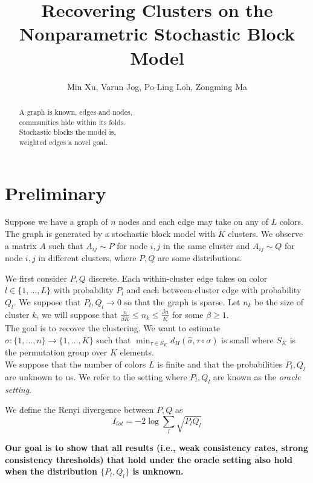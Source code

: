 \documentclass{article}
\begin{document}
\title{Recovering Clusters on the Nonparametric Stochastic Block Model}
\author{Min Xu, Varun Jog, Po-Ling Loh, Zongming Ma}
\maketitle

\begin{abstract}
\centering
\noindent 
A graph is known, edges and nodes, \\
communities hide within its folds. \\
Stochastic blocks the model is, \\
weighted edges a novel goal.
\end{abstract}

\tableofcontents


\newpage
\section{Preliminary}

Suppose we have a graph of $n$ nodes and each edge may take on any of $L$ colors. The graph is generated by a stochastic block model with $K$ clusters. We observe a matrix $A$ such that $A_{ij} \sim P$ for node $i,j$ in the same cluster and $A_{ij} \sim Q$ for node $i,j$ in different clusters, where $P,Q$ are some distributions. 

We first consider $P,Q$ discrete. Each within-cluster edge takes on color $l \in \{1,...,L\}$ with probability $P_l$ and each between-cluster edge with probability $Q_l$. We suppose that $P_l, Q_l \rightarrow 0$ so that the graph is sparse. Let $n_k$ be the size of cluster $k$, we will suppose that $\frac{n}{\beta K} \leq n_k \leq \frac{\beta n}{K}$ for some $\beta \geq 1$. \\

The goal is to recover the clustering. We want to estimate $\hat{\sigma} : \{1,...,n\} \rightarrow \{1,...,K\}$ such that $\min_{\tau \in S_K} d_H( \hat{\sigma}, \tau \circ \sigma)$ is small where $S_K$ is the permutation group over $K$ elements.\\

We suppose that the number of colors $L$ is finite and that the probabilities $P_l, Q_l$ are unknown to us. We refer to the setting where $P_l, Q_l$ are known as the \emph{oracle setting}. 

We define the Renyi divergence between $P,Q$ as
\[
I_{tot} = -2 \log \sum_l \sqrt{P_l Q_l}
\]

\textbf{Our goal is to show that all results (i.e., weak consistency rates, strong consistency thresholds) that hold under the oracle setting also hold when the distribution $\{P_l, Q_l\}$ is unknown. }
\end{document}
